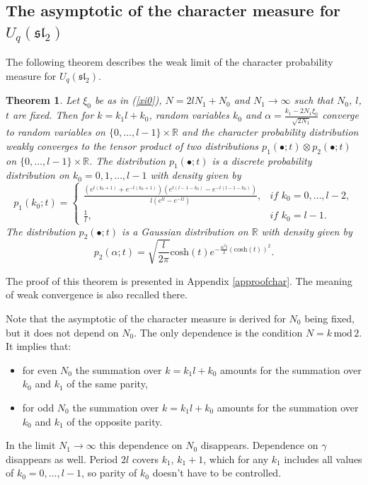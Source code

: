 \documentclass[11pt]{amsart}
\newcommand\lie[1]{\mathfrak{#1}}
\newtheorem{theorem}{Theorem}[section]
\begin{document}
\subsection{The asymptotic of the character measure for $U_q(\lie{sl}_2)$}\label{aschar}
The following theorem describes the weak limit of the character probability measure for $U_q(\lie{sl}_2)$.
\begin{theorem}\label{theomch}
    Let $\xi_0$ be as in (\ref{xi0}), $N=2lN_1+N_0$ and $N_1\to\infty$ such that $N_0$, $l$, $t$ are fixed. Then for $k=k_1l+k_0$, random variables $k_0$ and $\alpha=\frac{k_1-2N_1 \xi_0}{\sqrt{2N_1}}$ converge to random variables on $\{0,\ldots,l-1\}\times\mathbb{R}$ and the character probability distribution weakly converges to the tensor product of two distributions $p_1(\bullet;t)\otimes p_2(\bullet;t)$ on $\{0,\ldots,l-1\}\times\mathbb{R}$. The distribution $p_1(\bullet;t)$ is a discrete probability distribution on $k_0=0,1,\ldots,l-1$ with density given by
	\begin{equation}\label{p1}
		p_1(k_0;t)=\begin{cases}
			\frac{(e^{t(k_0+1)}+e^{-t(k_0+1)})(e^{t(l-1-k_0)}-e^{-t(l-1-k_0)})}{l(e^{tl}-e^{-tl})},& \textit{if $k_0=0,\ldots,l-2$},\\
			\frac{1}{l},& \textit{if $k_0=l-1$}.
		\end{cases}
	\end{equation}
	The distribution $p_2(\bullet;t)$ is a Gaussian distribution on $\mathbb{R}$ with density given by
	\begin{equation}\label{p2}
		p_2(\alpha;t)=\sqrt{\frac{l}{2\pi}}\mathrm{cosh}(t)e^{-\frac{\alpha^2l}{2}\left(\mathrm{cosh}(t)\right)^2}.
	\end{equation}
\end{theorem}
The proof of this theorem is presented in Appendix \ref{approofchar}. The meaning of weak convergence is also recalled there.


Note that the asymptotic of the character measure is derived for $N_0$ being fixed, but it does not depend on $N_0$. The only dependence is the condition $N=k\,\mathrm{mod}\,2$. It implies that:
\begin{itemize}
    \item for even $N_0$ the summation over $k=k_1 l+k_0$ amounts for the summation over $k_0$ and $k_1$ of the same parity,
    \item for odd $N_0$ the summation over $k=k_1 l+k_0$ amounts for the summation over $k_0$ and $k_1$ of the opposite parity.
\end{itemize}
In the limit $N_1\to\infty$ this dependence on $N_0$ disappears. Dependence on $\gamma$ disappears as well. Period $2l$ covers $k_1$, $k_1+1$, which for any $k_1$ includes all values of $k_0=0,\ldots,l-1$, so parity of $k_0$ doesn't have to be controlled.
\end{document}
